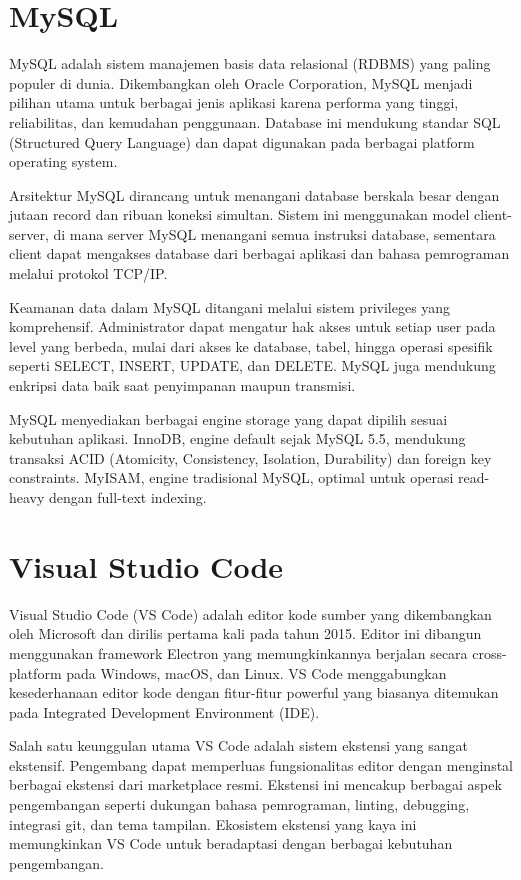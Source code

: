 \documentclass[a4paper,12pt]{report}
\begin{document}
\section{MySQL}
MySQL adalah sistem manajemen basis data relasional (RDBMS) yang paling populer di dunia. Dikembangkan oleh Oracle Corporation, MySQL menjadi pilihan utama untuk berbagai jenis aplikasi karena performa yang tinggi, reliabilitas, dan kemudahan penggunaan. Database ini mendukung standar SQL (Structured Query Language) dan dapat digunakan pada berbagai platform operating system.

Arsitektur MySQL dirancang untuk menangani database berskala besar dengan jutaan record dan ribuan koneksi simultan. Sistem ini menggunakan model client-server, di mana server MySQL menangani semua instruksi database, sementara client dapat mengakses database dari berbagai aplikasi dan bahasa pemrograman melalui protokol TCP/IP.

Keamanan data dalam MySQL ditangani melalui sistem privileges yang komprehensif. Administrator dapat mengatur hak akses untuk setiap user pada level yang berbeda, mulai dari akses ke database, tabel, hingga operasi spesifik seperti SELECT, INSERT, UPDATE, dan DELETE. MySQL juga mendukung enkripsi data baik saat penyimpanan maupun transmisi.

MySQL menyediakan berbagai engine storage yang dapat dipilih sesuai kebutuhan aplikasi. InnoDB, engine default sejak MySQL 5.5, mendukung transaksi ACID (Atomicity, Consistency, Isolation, Durability) dan foreign key constraints. MyISAM, engine tradisional MySQL, optimal untuk operasi read-heavy dengan full-text indexing.

\section{Visual Studio Code}
Visual Studio Code (VS Code) adalah editor kode sumber yang dikembangkan oleh Microsoft dan dirilis pertama kali pada tahun 2015. Editor ini dibangun menggunakan framework Electron yang memungkinkannya berjalan secara cross-platform pada Windows, macOS, dan Linux. VS Code menggabungkan kesederhanaan editor kode dengan fitur-fitur powerful yang biasanya ditemukan pada Integrated Development Environment (IDE).

Salah satu keunggulan utama VS Code adalah sistem ekstensi yang sangat ekstensif. Pengembang dapat memperluas fungsionalitas editor dengan menginstal berbagai ekstensi dari marketplace resmi. Ekstensi ini mencakup berbagai aspek pengembangan seperti dukungan bahasa pemrograman, linting, debugging, integrasi git, dan tema tampilan. Ekosistem ekstensi yang kaya ini memungkinkan VS Code untuk beradaptasi dengan berbagai kebutuhan pengembangan.
\end{document}
